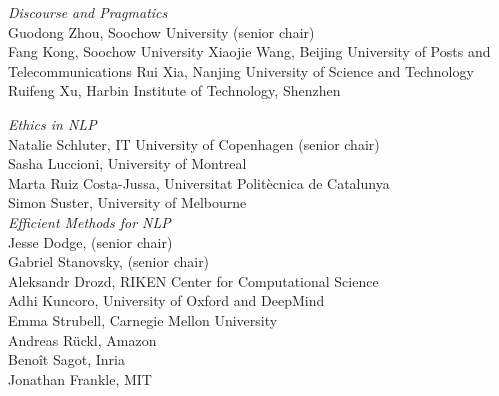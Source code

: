 \emph{Discourse and Pragmatics} \\
\hspace*{0.2in} Guodong Zhou, Soochow University (senior chair)\\
\hspace*{0.2in} Fang Kong, Soochow University
\hspace*{0.2in} Xiaojie Wang, Beijing University of Posts and Telecommunications
\hspace*{0.2in} Rui Xia, Nanjing University of Science and Technology
\hspace*{0.2in} Ruifeng Xu, Harbin Institute of Technology, Shenzhen

\emph{Ethics in NLP} \\
\hspace*{0.2in} Natalie Schluter, IT University of Copenhagen (senior chair)\\
\hspace*{0.2in} Sasha Luccioni, University of Montreal \\
\hspace*{0.2in} Marta Ruiz Costa-Jussa, Universitat Politècnica de Catalunya\\
\hspace*{0.2in} Simon Suster, University of Melbourne\\

\emph{Efficient Methods for NLP} \\
\hspace*{0.2in} Jesse Dodge, (senior chair)\\
\hspace*{0.2in} Gabriel Stanovsky, (senior chair)\\
\hspace*{0.2in} Aleksandr Drozd, RIKEN Center for Computational Science\\
\hspace*{0.2in} Adhi Kuncoro, University of Oxford and DeepMind\\
\hspace*{0.2in} Emma Strubell, Carnegie Mellon University\\
\hspace*{0.2in} Andreas Rückl, Amazon\\
\hspace*{0.2in} Benoît Sagot, Inria\\
\hspace*{0.2in} Jonathan Frankle, MIT\\

